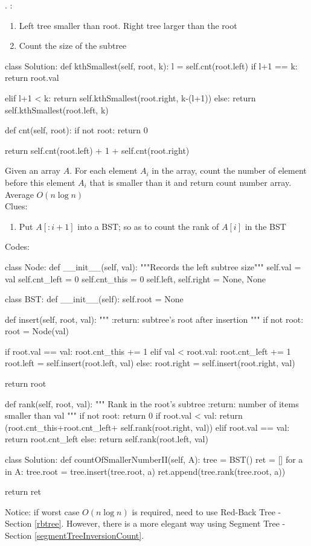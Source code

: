 . 
:
\begin{enumerate}
\item Left tree smaller than root. Right tree larger than the root
\item Count the size of the subtree
\end{enumerate}
\begin{python}
class Solution:
  def kthSmallest(self, root, k):
    l = self.cnt(root.left)
    if l+1 == k:
      return root.val
    
    elif l+1 < k:
      return self.kthSmallest(root.right, k-(l+1))
    else:
      return self.kthSmallest(root.left, k)

  def cnt(self, root):
    if not root:
      return 0

    return self.cnt(root.left) + 1 + self.cnt(root.right)
\end{python}
 Given an array $A$. For each element $A_i$ in the array, count the number of element before this element $A_i$ that is smaller than it and return count number array. Average $O(n \log n)$
\\
Clues:
\begin{enumerate}
\item Put $A[:i+1]$ into a BST; so as to count the rank of $A[i]$ in the BST
\end{enumerate}
Codes:
\begin{python}
class Node:
  def __init__(self, val):
    """Records the left subtree size"""
    self.val = val
    self.cnt_left = 0
    self.cnt_this = 0
    self.left, self.right = None, None


class BST:
  def __init__(self):
    self.root = None

  def insert(self, root, val):
    """
    :return: subtree's root after insertion
    """
    if not root:
      root = Node(val)

    if root.val == val:
      root.cnt_this += 1
    elif val < root.val:
      root.cnt_left += 1
      root.left = self.insert(root.left, val)
    else:
      root.right = self.insert(root.right, val)

    return root

  def rank(self, root, val):
    """
    Rank in the root's subtree
    :return: number of items smaller than val
    """
    if not root:
      return 0
    if root.val < val:
      return (root.cnt_this+root.cnt_left+
              self.rank(root.right, val))
    elif root.val == val:
      return root.cnt_left
    else:
      return self.rank(root.left, val)


class Solution:
  def countOfSmallerNumberII(self, A):
    tree = BST()
    ret = []
    for a in A:
      tree.root = tree.insert(tree.root, a)
      ret.append(tree.rank(tree.root, a))

    return ret
\end{python}
Notice: if worst case $O(n \log n)$ is required, need to use Red-Back Tree - Section \ref{rbtree}. However, there is a more elegant way using Segment Tree - Section \ref{segmentTreeInversionCount}.


